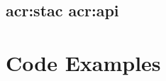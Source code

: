 \begin{appendix}
    \section[STAC API]{\acrshort{acr:stac} \acrshort{acr:api}}

    \chapter{Code Examples}

\end{appendix}